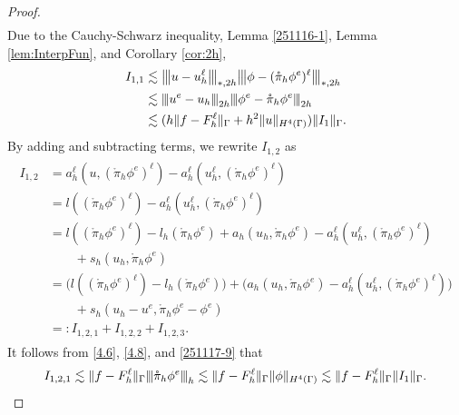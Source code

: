 \documentclass[10pt, a4paper]{amsart}
\theoremstyle{definition}
\theoremstyle{remark}
\theoremstyle{example}
\numberwithin{equation}{section}
\newcommand{\tbar}[1]{{\left\vert\kern-0.25ex\left\vert\kern-0.25ex\left\vert #1 
    \right\vert\kern-0.25ex\right\vert\kern-0.25ex\right\vert}}
\begin{document}
\begin{proof}
\begin{align}
\end{align}
Due to the Cauchy-Schwarz inequality, Lemma \ref{251116-1}, 
Lemma \ref{lem:InterpFun}, and Corollary \ref{cor:2h},
\begin{align}
\begin{split} \label{251117-13}
I_{1,1}
& \lesssim \tbar{u - u_h^\ell}_{*, 2h}\tbar{\phi - (\mathring{\pi}_h\phi^e)^\ell}_{*, 2h} \\
& \lesssim \tbar{u^e - u_h}_{2h}\tbar{\phi^e - \mathring{\pi}_h\phi^e}_{2h} \\
&\lesssim (h\|f-F_h^\ell\|_\Gamma+h^2 \|u\|_{H^4(\Gamma)}) \|I_1\|_\Gamma.
\end{split}
\end{align}
By adding and subtracting terms, we rewrite $I_{1,2}$ as
\begin{align}
\begin{split} \label{251117-14}
I_{1,2}
& = a_h^\ell(u, (\mathring{\pi}_h\phi^e)^\ell) - a_h^\ell(u_h^\ell, (\mathring{\pi}_h\phi^e)^\ell) \\
& = l((\mathring{\pi}_h\phi^e)^\ell) - a_h^\ell(u_h^\ell, (\mathring{\pi}_h\phi^e)^\ell) \\
& = l((\mathring{\pi}_h\phi^e)^\ell) - l_h(\mathring{\pi}_h\phi^e) + a_h(u_h, \mathring{\pi}_h\phi^e) - a_h^\ell(u_h^\ell, (\mathring{\pi}_h\phi^e)^\ell) \\
& \qquad + s_h(u_h, \mathring{\pi}_h\phi^e) \\
& = \Big(l((\mathring{\pi}_h\phi^e)^\ell) - l_h(\mathring{\pi}_h\phi^e)\Big) + \Big(a_h(u_h, \mathring{\pi}_h\phi^e) - a_h^\ell(u_h^\ell, (\mathring{\pi}_h\phi^e)^\ell)\Big) \\
& \qquad + s_h(u_h - u^e, \mathring{\pi}_h\phi^e - \phi^e) \\
& =: I_{1,2,1} + I_{1,2,2} + I_{1,2,3}.
\end{split}
\end{align}
It follows from \eqref{4.6}, \eqref{4.8}, and \eqref{251117-9} that
\begin{align}
\begin{split} \label{251117-15}
I_{1,2,1}
\lesssim \|f - F_h^\ell\|_\Gamma\tbar{\mathring{\pi}_h\phi^e}_h
\lesssim \|f - F_h^\ell\|_\Gamma\|\phi\|_{H^4(\Gamma)}
\lesssim \|f - F_h^\ell\|_\Gamma\|I_1\|_\Gamma.
\end{split}
\end{align}

\end{proof}
\end{document}
